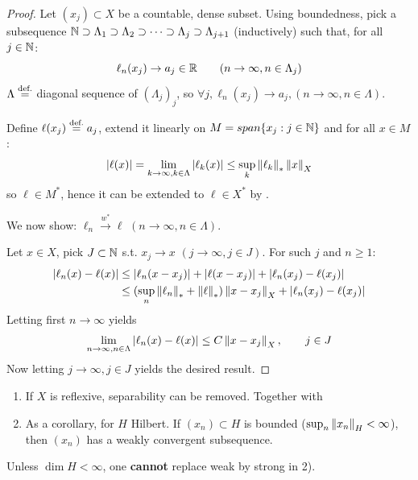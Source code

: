 \documentclass{article}
\begin{document}
\begin{proof}
    Let $(x_j) \subset X$ be a countable, dense subset. Using boundedness, pick a subsequence $\mathbb{N} \supset \Lambda_1 \supset \Lambda_2 \supset \cdots \supset \Lambda_j \supset \Lambda_{j+1}$ (inductively) such that, for all $j \in \mathbb{N}$:  
    $$
    \ell_n (x_j) \to a_j \in \mathbb{R} \qquad (n \to \infty, n\in \Lambda_j)
    $$  
    $\Lambda \stackrel{\text{def.}}{=}$ diagonal sequence of $(\Lambda_j)_j$, so $\forall j, \ell_n(x_j) \to a_j, (n\to \infty, n\in \Lambda)$. 
    
    Define $\ell(x_j) \stackrel{\text{def.}}{=} a_j$, extend it linearly on $M = span \{x_j: j\in \mathbb{N}\}$ and for all $x\in M$:  
    $$
    |\ell(x)| = \lim_{k\to \infty, k\in \Lambda} |\ell_k(x)| \leq \sup_k \left\|{\ell_k}\right\|_* \left\|{x}\right\|_{X}
    $$
    so $\ell \in M^*$, hence it can be extended to $\ell \in X^*$ by .  

    We now show: $\ell_n \overset{w^*}{\rightarrow} \ell$ $(n \to \infty, n \in \Lambda)$. 
    
    Let $x\in X$, pick $J \subset \mathbb{N}$ s.t. $x_j \to x$ $(j\to \infty, j \in J)$. For such $j$ and $n\geq 1$:  
    \begin{align*}
        |\ell_n(x)-\ell(x)| &\leq |\ell_n(x-x_j)| + |\ell(x-x_j)| + |\ell_n(x_j)-\ell(x_j)| \\
        &\leq (\sup_n \left\|{\ell_n}\right\|_* + \left\|{\ell}\right\|_*) \left\|{x-x_j}\right\|_X + |\ell_n(x_j)-\ell(x_j)|
    \end{align*}
    Letting first $n\to \infty$ yields  
    $$
    \lim_{n\to \infty, n\in \Lambda} |\ell_n(x)-\ell(x)| \leq C \left\|{x-x_j}\right\|_X, \qquad j \in J
    $$  
    Now letting $j\to \infty, j\in J$ yields the desired result.
\end{proof}  

\begin{remark}
    \begin{enumerate}[1)]
        \item If $X$ is reflexive, separability can be removed. Together with 

        \item As a corollary, for $H$ Hilbert. If $(x_n) \subset H$ is bounded ($\sup_n \left\|{x_n}\right\|_H < \infty$), then $(x_n)$ has a weakly convergent subsequence.  

        
    \end{enumerate}
\end{remark}

Unless $\dim H<\infty$, one \textbf{cannot} replace weak by strong in 2).
\end{document}
